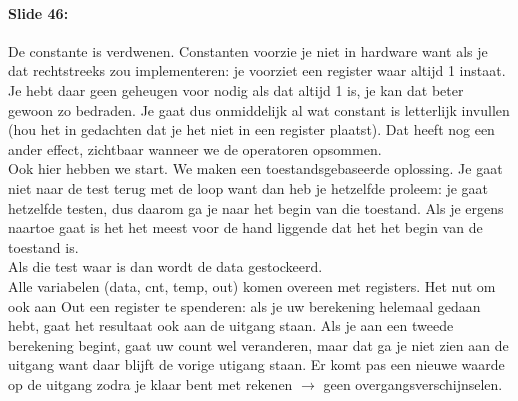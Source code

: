 \documentclass[10pt,a4paper]{book}
\begin{document}
\paragraph{Slide 46:} De constante is verdwenen. Constanten voorzie je niet in hardware want als je dat rechtstreeks zou implementeren: je voorziet een register waar altijd 1 instaat. Je hebt daar geen geheugen voor nodig als dat altijd 1 is, je kan dat beter gewoon zo bedraden. Je gaat dus onmiddelijk al wat constant is letterlijk invullen (hou het in gedachten dat je het niet in een register plaatst). Dat heeft nog een ander effect, zichtbaar wanneer we de operatoren opsommen.\\
Ook hier hebben we start. We maken een toestandsgebaseerde oplossing. Je gaat niet naar de test terug met de loop want dan heb je hetzelfde proleem: je gaat hetzelfde testen, dus daarom ga je naar het begin van die toestand. Als je ergens naartoe gaat is het het meest voor de hand liggende dat het het begin van de toestand is.\\
Als die test waar is dan wordt de data gestockeerd.\\
Alle variabelen (data, cnt, temp, out) komen overeen met registers. Het nut om ook aan Out een register te spenderen: als je uw berekening helemaal gedaan hebt, gaat het resultaat ook aan de uitgang staan. Als je aan een tweede berekening begint, gaat uw count wel veranderen, maar dat ga je niet zien aan de uitgang want daar blijft de vorige utigang staan. Er komt pas een nieuwe waarde op de uitgang zodra je klaar bent met rekenen $\rightarrow$ geen overgangsverschijnselen.
\end{document}

